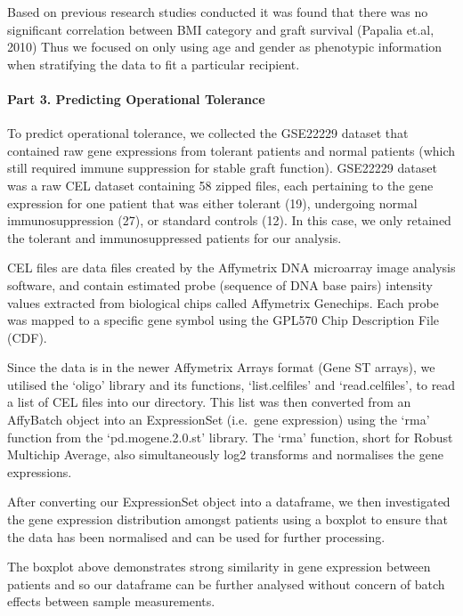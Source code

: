 \documentclass[a4paper,9pt,twocolumn,twoside,]{pinp}
\begin{document}
Based on previous research studies conducted it was found that there was
no significant correlation between BMI category and graft survival
(Papalia et.al, 2010) Thus we focused on only using age and gender as
phenotypic information when stratifying the data to fit a particular
recipient.

\hypertarget{part-3.-predicting-operational-tolerance}{%
\paragraph{Part 3. Predicting Operational
Tolerance}\label{part-3.-predicting-operational-tolerance}}

To predict operational tolerance, we collected the GSE22229 dataset that
contained raw gene expressions from tolerant patients and normal
patients (which still required immune suppression for stable graft
function). GSE22229 dataset was a raw CEL dataset containing 58 zipped
files, each pertaining to the gene expression for one patient that was
either tolerant (19), undergoing normal immunosuppression (27), or
standard controls (12). In this case, we only retained the tolerant and
immunosuppressed patients for our analysis.

CEL files are data files created by the Affymetrix DNA microarray image
analysis software, and contain estimated probe (sequence of DNA base
pairs) intensity values extracted from biological chips called
Affymetrix Genechips. Each probe was mapped to a specific gene symbol
using the GPL570 Chip Description File (CDF).

Since the data is in the newer Affymetrix Arrays format (Gene ST
arrays), we utilised the `oligo' library and its functions,
`list.celfiles' and `read.celfiles', to read a list of CEL files into
our directory. This list was then converted from an AffyBatch object
into an ExpressionSet (i.e.~gene expression) using the `rma' function
from the `pd.mogene.2.0.st' library. The `rma' function, short for
Robust Multichip Average, also simultaneously log2 transforms and
normalises the gene expressions.

After converting our ExpressionSet object into a dataframe, we then
investigated the gene expression distribution amongst patients using a
boxplot to ensure that the data has been normalised and can be used for
further processing.

The boxplot above demonstrates strong similarity in gene expression
between patients and so our dataframe can be further analysed without
concern of batch effects between sample measurements.
\end{document}
